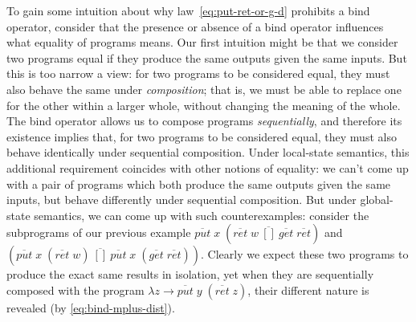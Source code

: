 \documentclass{llncs}
\newcommand{\Varid}[1]{\mathit{#1}}
\let\Varid\mathit
\begin{document}
To gain some intuition about why law~\eqref{eq:put-ret-or-g-d} prohibits a bind
operator, consider that the presence or absence of a bind operator influences
what equality of programs means.
Our first intuition might be that we consider two programs equal if they produce
the same outputs given the same inputs. But this is too narrow a view: for
two programs to be considered equal, they must also behave the same under
\emph{composition}; that is, we must be able to replace one for the other within
a larger whole, without changing the meaning of the whole.
The bind operator allows us to compose programs \emph{sequentially}, and
therefore its existence implies that, for two programs to be considered equal,
they must also behave identically under sequential composition.
Under local-state semantics, this additional requirement coincides with other
notions of equality: we can't come up with a pair of
programs which both produce the same outputs given the same inputs, but behave
differently under sequential composition.
But under global-state semantics, we can come up with such counterexamples:
consider the subprograms of our previous example
\ensuremath{\overline{\Varid{put}}\;\Varid{x}\;(\overline{\Varid{ret}}\;\Varid{w}~\overline{[\!]}~\overline{\Varid{get}}\;\overline{\Varid{ret}})} and
\ensuremath{(\overline{\Varid{put}}\;\Varid{x}\;(\overline{\Varid{ret}}\;\Varid{w})~\overline{[\!]}~\overline{\Varid{put}}\;\Varid{x}\;(\overline{\Varid{get}}\;\overline{\Varid{ret}}))}.
Clearly we expect these two programs to produce the exact same results in
isolation, yet when they are sequentially composed with the program
\ensuremath{\lambda \Varid{z}\to \overline{\Varid{put}}\;\Varid{y}\;(\overline{\Varid{ret}}\;\Varid{z})}, their different nature is revealed (by \eqref{eq:bind-mplus-dist}).
\end{document}
